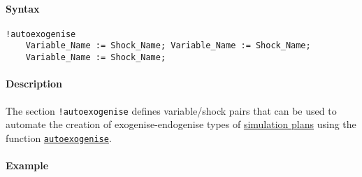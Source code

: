 


	\paragraph{Syntax}\label{syntax}

\begin{verbatim}
!autoexogenise
    Variable_Name := Shock_Name; Variable_Name := Shock_Name;
    Variable_Name := Shock_Name;
\end{verbatim}

\paragraph{Description}\label{description}

The section \texttt{!autoexogenise} defines variable/shock pairs that
can be used to automate the creation of exogenise-endogenise types of
\href{plan/Contents}{simulation plans} using the function
\href{plan/autoexogenise}{\texttt{autoexogenise}}.

\paragraph{Example}\label{example}


